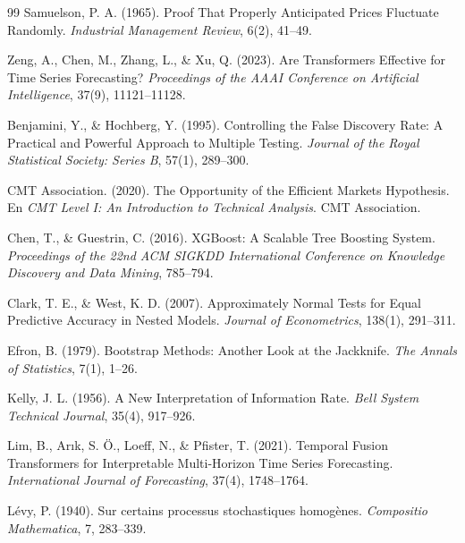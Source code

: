 ﻿\documentclass[11pt,a4paper]{article}
\begin{document}
\begin{thebibliography}{99}
Samuelson, P. A. (1965).
\newblock Proof That Properly Anticipated Prices Fluctuate Randomly.
\newblock \textit{Industrial Management Review}, 6(2), 41--49.

Zeng, A., Chen, M., Zhang, L., \& Xu, Q. (2023).
\newblock Are Transformers Effective for Time Series Forecasting?
\newblock \textit{Proceedings of the AAAI Conference on Artificial Intelligence}, 37(9), 11121--11128.

Benjamini, Y., \& Hochberg, Y. (1995).
\newblock Controlling the False Discovery Rate: A Practical and Powerful Approach to Multiple Testing.
\newblock \textit{Journal of the Royal Statistical Society: Series B}, 57(1), 289--300.

CMT Association. (2020).
 The Opportunity of the Efficient Markets Hypothesis.
\newblock En \textit{CMT Level I: An Introduction to Technical Analysis}.
\newblock CMT Association.

Chen, T., \& Guestrin, C. (2016).
\newblock XGBoost: A Scalable Tree Boosting System.
\newblock \textit{Proceedings of the 22nd ACM SIGKDD International Conference on Knowledge Discovery and Data Mining}, 785--794.

Clark, T. E., \& West, K. D. (2007).
\newblock Approximately Normal Tests for Equal Predictive Accuracy in Nested Models.
\newblock \textit{Journal of Econometrics}, 138(1), 291--311.

Efron, B. (1979).
\newblock Bootstrap Methods: Another Look at the Jackknife.
\newblock \textit{The Annals of Statistics}, 7(1), 1--26.

Kelly, J. L. (1956).
\newblock A New Interpretation of Information Rate.
\newblock \textit{Bell System Technical Journal}, 35(4), 917--926.


Lim, B., Ar{\i}k, S. \"O., Loeff, N., \& Pfister, T. (2021).
\newblock Temporal Fusion Transformers for Interpretable Multi-Horizon Time Series Forecasting.
\newblock \textit{International Journal of Forecasting}, 37(4), 1748--1764.

L\'evy, P. (1940).
\newblock Sur certains processus stochastiques homog\`enes.
\newblock \textit{Compositio Mathematica}, 7, 283--339.


\end{thebibliography}
\end{document}
